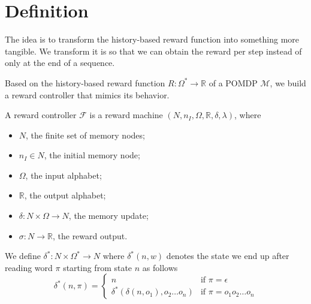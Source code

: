\section{Definition}


The idea is to transform the history-based reward function into something more tangible. We transform it is so that we can obtain the reward per step instead of only at the end of a sequence.


Based on the history-based reward function $R:\Omega^*\to\mathbb{R}$ of a POMDP $\mathcal{M}$, we build a reward controller that mimics its behavior.



\begin{definition}
	A reward controller $\mathcal{F}$ is a reward machine $(N,n_I, \Omega, \mathbb{R}, \delta, \lambda)$, where
	\begin{itemize}
		\item $N$, the finite set of memory nodes;
		\item $n_I\in N$, the initial memory node;
		\item $\Omega$, the input alphabet;
		\item $\mathbb{R}$, the output alphabet;
		\item $\delta: N \times \Omega \to N$, the memory update;
		\item $\sigma: N \to \mathbb{R}$, the reward output. 
	\end{itemize}
\end{definition}


\begin{definition}
We define $\delta^*:N\times\Omega^*\to N$ where $\delta^*(n,w)$ denotes the state we end up after reading word $\pi$ starting from state $n$ as follows
\begin{equation*}
\delta^*(n,\pi)=\begin{cases}
	n &\text{if } \pi=\epsilon \\
	\delta^*(\delta(n,o_1),o_2\dots o_n) & \text{if } \pi=o_1 o_2\dots o_n
	\end{cases}
\end{equation*}
\label{d:delta_star_rc}
\end{definition}






